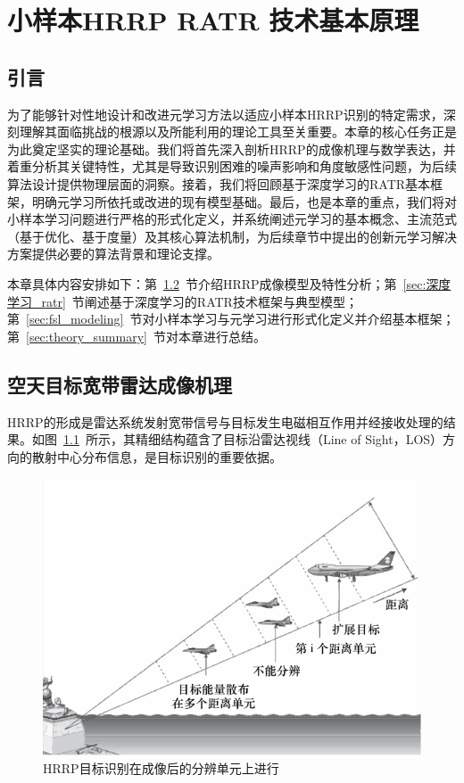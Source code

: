 \chapter{小样本HRRP RATR 技术基本原理}
\label{chap:theory}

\section{引言}
\label{sec:theory_intro}

为了能够针对性地设计和改进元学习方法以适应小样本HRRP识别的特定需求，深刻理解其面临挑战的根源以及所能利用的理论工具至关重要。本章的核心任务正是为此奠定坚实的理论基础。我们将首先深入剖析HRRP的成像机理与数学表达，并着重分析其关键特性，尤其是导致识别困难的噪声影响和角度敏感性问题，为后续算法设计提供物理层面的洞察。接着，我们将回顾基于深度学习的RATR基本框架，明确元学习所依托或改进的现有模型基础。最后，也是本章的重点，我们将对小样本学习问题进行严格的形式化定义，并系统阐述元学习的基本概念、主流范式（基于优化、基于度量）及其核心算法机制，为后续章节中提出的创新元学习解决方案提供必要的算法背景和理论支撑。

本章具体内容安排如下：第~\ref{sec:hrrp_mechanism}~节介绍HRRP成像模型及特性分析；第~\ref{sec:深度学习_ratr}~节阐述基于深度学习的RATR技术框架与典型模型；第~\ref{sec:fsl_modeling}~节对小样本学习与元学习进行形式化定义并介绍基本框架；第~\ref{sec:theory_summary}~节对本章进行总结。

\section{空天目标宽带雷达成像机理}
\label{sec:hrrp_mechanism}

HRRP的形成是雷达系统发射宽带信号与目标发生电磁相互作用并经接收处理的结果。如图~\ref{fig:ship_plane}~所示，其精细结构蕴含了目标沿雷达视线（Line of Sight，LOS）方向的散射中心分布信息，是目标识别的重要依据。

\begin{figure}[h]
    \centering
    \includegraphics[width=0.8\linewidth]{figures/ship_plane.pdf}
    \caption{HRRP目标识别在成像后的分辨单元上进行}
    \label{fig:ship_plane}
\end{figure}

